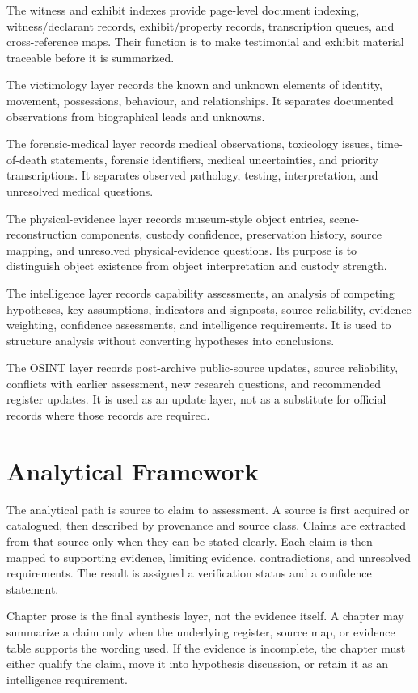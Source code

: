 The witness and exhibit indexes provide page-level document indexing, witness/declarant records, exhibit/property records, transcription queues, and cross-reference maps. Their function is to make testimonial and exhibit material traceable before it is summarized.

The victimology layer records the known and unknown elements of identity, movement, possessions, behaviour, and relationships. It separates documented observations from biographical leads and unknowns.

The forensic-medical layer records medical observations, toxicology issues, time-of-death statements, forensic identifiers, medical uncertainties, and priority transcriptions. It separates observed pathology, testing, interpretation, and unresolved medical questions.

The physical-evidence layer records museum-style object entries, scene-reconstruction components, custody confidence, preservation history, source mapping, and unresolved physical-evidence questions. Its purpose is to distinguish object existence from object interpretation and custody strength.

The intelligence layer records capability assessments, an analysis of competing hypotheses, key assumptions, indicators and signposts, source reliability, evidence weighting, confidence assessments, and intelligence requirements. It is used to structure analysis without converting hypotheses into conclusions.

The OSINT layer records post-archive public-source updates, source reliability, conflicts with earlier assessment, new research questions, and recommended register updates. It is used as an update layer, not as a substitute for official records where those records are required.

\section{Analytical Framework}

The analytical path is source to claim to assessment. A source is first acquired or catalogued, then described by provenance and source class. Claims are extracted from that source only when they can be stated clearly. Each claim is then mapped to supporting evidence, limiting evidence, contradictions, and unresolved requirements. The result is assigned a verification status and a confidence statement.

Chapter prose is the final synthesis layer, not the evidence itself. A chapter may summarize a claim only when the underlying register, source map, or evidence table supports the wording used. If the evidence is incomplete, the chapter must either qualify the claim, move it into hypothesis discussion, or retain it as an intelligence requirement.

